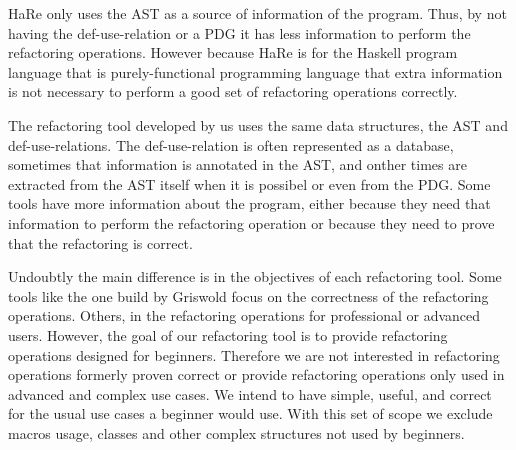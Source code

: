 HaRe only uses the AST as a source of information of the program. Thus, by not having
the def-use-relation or a PDG it has less information to perform the refactoring operations.
However because HaRe is for the Haskell program language that is purely-functional
programming language that extra information is not necessary to perform a good set of
refactoring operations correctly.




The refactoring tool developed by us uses the same data structures, the AST and
def-use-relations. The def-use-relation is often represented as a database, sometimes
that information is annotated in the AST, %
and onther times are extracted from the AST itself when it is possibel or even
from the PDG.
Some tools have more information about the program, either because they need that
information to perform the refactoring operation or because they need to prove that
the refactoring is correct.  %

Undoubtly the main difference is in the objectives of each refactoring tool.
Some tools like the one build by Griswold focus on the correctness of the refactoring
operations.
Others, in the refactoring operations for professional or advanced users.
However, the goal of our refactoring tool is to provide refactoring operations
designed for beginners. %
Therefore we are not interested in refactoring operations formerly proven %
correct or provide refactoring operations only used in advanced and complex use cases. %
We intend to have simple, useful, and correct for the usual use cases a beginner would use.
With this set of scope we exclude macros usage, classes and other complex structures %
not used by beginners.


